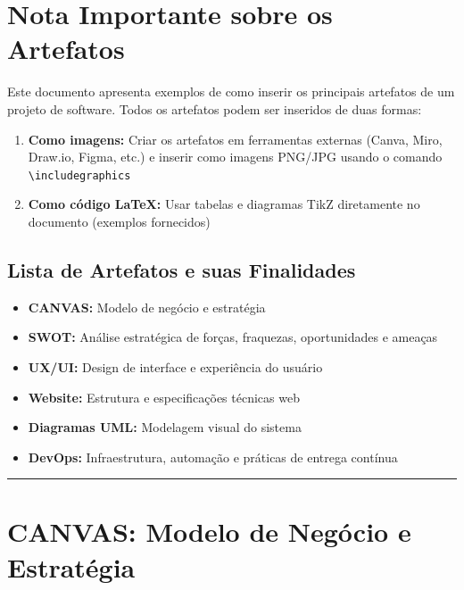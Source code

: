 \documentclass[11pt,a4paper]{article}
\begin{document}
\pagestyle{fancy}

\tableofcontents
\newpage

\section*{Nota Importante sobre os Artefatos}

\noindent Este documento apresenta exemplos de como inserir os principais artefatos de um projeto de software. Todos os artefatos podem ser inseridos de duas formas:

\begin{enumerate}
    \item \textbf{Como imagens:} Criar os artefatos em ferramentas externas (Canva, Miro, Draw.io, Figma, etc.) e inserir como imagens PNG/JPG usando o comando \texttt{\textbackslash includegraphics}
    \item \textbf{Como código LaTeX:} Usar tabelas e diagramas TikZ diretamente no documento (exemplos fornecidos)
\end{enumerate}

\subsection*{Lista de Artefatos e suas Finalidades}

\begin{itemize}
    \item \textbf{CANVAS:} Modelo de negócio e estratégia
    \item \textbf{SWOT:} Análise estratégica de forças, fraquezas, oportunidades e ameaças
    \item \textbf{UX/UI:} Design de interface e experiência do usuário
    \item \textbf{Website:} Estrutura e especificações técnicas web
    \item \textbf{Diagramas UML:} Modelagem visual do sistema
    \item \textbf{DevOps:} Infraestrutura, automação e práticas de entrega contínua
\end{itemize}

\vspace{0.5cm}
\noindent\rule{\textwidth}{0.5pt}

\newpage

\section{CANVAS: Modelo de Negócio e Estratégia}
\end{document}
